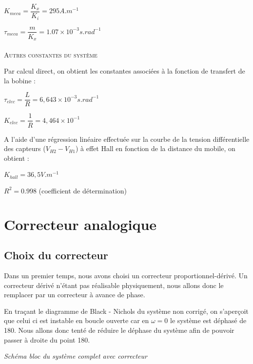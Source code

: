 \documentclass[11pt, french]{article} %
\begin{document}
\medskip
$  K_{meca} = \dfrac {K_x}{K_i} =  295 A.m^{-1} $

\medskip
$  \tau_{meca} = \dfrac m {K_x} = 1.07 \times 10^{-3} s.rad^{-1} $

\paragraph{}
\textsc{Autres constantes du système}

\noindent
Par calcul direct, on obtient les constantes associées à la fonction de transfert de la bobine :

\medskip
$  \tau_{elec} = \dfrac L R = 6,643 \times 10^{-3} s.rad^{-1} $

\medskip
$  K_{elec} = \dfrac 1 R = 4,464 \times 10^{-1} $
\medskip

\noindent
A l'aide d'une régression linéaire effectuée sur la courbe de la tension différentielle des capteurs ($ V_{H2} - V_{H1} $) à effet Hall en fonction de la distance du mobile, on obtient :

\medskip
$  K_{hall} = 36,5 V.m^{-1} $

\medskip
$ R^2 = 0.998 $ (coefficient de détermination)
\medskip

\section{Correcteur analogique}
\subsection{Choix du correcteur}
Dans un premier temps, nous avons choisi un correcteur proportionnel-dérivé. Un correcteur dérivé n'étant pas réalisable physiquement, nous allons donc le remplacer par un correcteur à avance de phase.

\medskip
En traçant le diagramme de Black - Nichols du système non corrigé, on s'aperçoit que celui ci est instable en boucle ouverte car en $\omega = 0$ le système est déphasé de 180. Nous allons donc tenté de réduire le déphase du système afin de pouvoir passer à droite du point 180.

\medskip
\begin{center}

\emph{Schéma bloc du système complet avec correcteur}
\end{center}
\begin{quote}

%

\end{quote}
\end{document}
